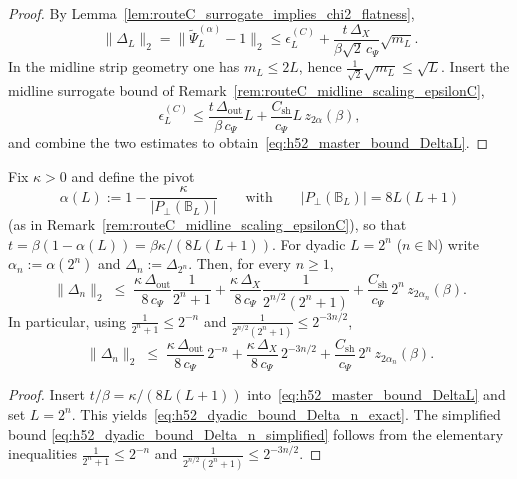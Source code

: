 \begin{proof}
By Lemma~\ref{lem:routeC_surrogate_implies_chi2_flatness},
\[
\|\Delta_L\|_2
=
\|\widetilde\Psi_L^{(\alpha)}-1\|_2
\le
\epsilon_L^{(C)}
+
\frac{t\,\Delta_X}{\beta\sqrt2\,c_\Psi}\sqrt{m_L}.
\]
In the midline strip geometry one has $m_L\le 2L$, hence
$\frac{1}{\sqrt2}\sqrt{m_L}\le \sqrt{L}$.
Insert the midline surrogate bound of Remark~\ref{rem:routeC_midline_scaling_epsilonC},
\[
\epsilon_L^{(C)}\le \frac{t\,\Delta_{\mathrm{out}}}{\beta\,c_\Psi}L+\frac{C_{\mathrm{sh}}}{c_\Psi}L\,z_{2\alpha}(\beta),
\]
and combine the two estimates to obtain~\eqref{eq:h52_master_bound_DeltaL}.
\end{proof}

\begin{corollary}[Dyadic instantiation $L=2^n$ under the pivot schedule $\alpha(L)$]
\label{cor:h52_Delta_n_bound_dyadic}
Fix $\kappa>0$ and define the pivot
\[
\alpha(L):=1-\frac{\kappa}{|P_\perp(\mathbb B_L)|}
\qquad\text{with}\qquad
|P_\perp(\mathbb B_L)|=8L(L+1)
\]
(as in Remark~\ref{rem:routeC_midline_scaling_epsilonC}), so that
$t=\beta(1-\alpha(L))=\beta\kappa/(8L(L+1))$.
For dyadic $L=2^n$ ($n\in\mathbb N$) write $\alpha_n:=\alpha(2^n)$ and
$\Delta_n:=\Delta_{2^n}$. Then, for every $n\ge 1$,
\begin{equation}
\label{eq:h52_dyadic_bound_Delta_n_exact}
\|\Delta_n\|_2
\;\le\;
\frac{\kappa\,\Delta_{\mathrm{out}}}{8\,c_\Psi}\frac{1}{2^n+1}
+
\frac{\kappa\,\Delta_X}{8\,c_\Psi}\frac{1}{2^{n/2}(2^n+1)}
+
\frac{C_{\mathrm{sh}}}{c_\Psi}\,2^n\,z_{2\alpha_n}(\beta).
\end{equation}
In particular, using $\frac{1}{2^n+1}\le 2^{-n}$ and $\frac{1}{2^{n/2}(2^n+1)}\le 2^{-3n/2}$,
\begin{equation}
\label{eq:h52_dyadic_bound_Delta_n_simplified}
\|\Delta_n\|_2
\;\le\;
\frac{\kappa\,\Delta_{\mathrm{out}}}{8\,c_\Psi}\,2^{-n}
+
\frac{\kappa\,\Delta_X}{8\,c_\Psi}\,2^{-3n/2}
+
\frac{C_{\mathrm{sh}}}{c_\Psi}\,2^n\,z_{2\alpha_n}(\beta).
\end{equation}
\end{corollary}

\begin{proof}
Insert $t/\beta=\kappa/(8L(L+1))$ into~\eqref{eq:h52_master_bound_DeltaL} and set $L=2^n$.
This yields~\eqref{eq:h52_dyadic_bound_Delta_n_exact}. The simplified bound
\eqref{eq:h52_dyadic_bound_Delta_n_simplified} follows from the elementary inequalities
$\frac{1}{2^n+1}\le 2^{-n}$ and $\frac{1}{2^{n/2}(2^n+1)}\le 2^{-3n/2}$.
\end{proof}


